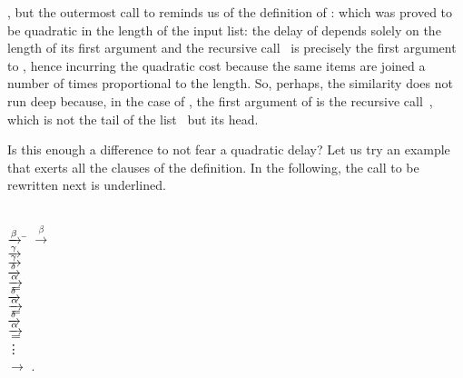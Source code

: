 \clause{\gamma}, but the outermost call to  reminds us
of the definition of :
 which was proved  to be
quadratic in the length of the input list: the delay
of  depends solely on the length of its first argument
and the recursive call~ is precisely the first
argument to , hence incurring the quadratic cost
because the same items are joined a number of times proportional to
the length. So, perhaps, the similarity does not run deep because, in
the case of , the first argument of 
is the recursive call~, which is not the tail of
the list~\erlcode{[[I|M]|L]} but its head.

Is this enough a difference to not fear a quadratic delay? Let us try
an example that exerts all the clauses of the definition. In the
following, the call to be rewritten next is
underlined.\label{trace:sflat_abc}
\begin{tabbing}
\underline{}\\
\erlcode{sflat([[]} \= \(\xrightarrow{\smash{\beta}}\) \=\kill
\> \(\xrightarrow{\beta}\) \> \underline{}\\
\> \(\xrightarrow{\smash{\gamma}}\) \> \\
\> \(\xrightarrow{\smash{\gamma}}\)
\> \\
\> \(\xrightarrow{\smash{\delta}}\)
\> \\
\> \(\xrightarrow{\smash{\alpha}}\)
\> \\
\> \(=\)
\> \\
\> \(\xrightarrow{\smash{\delta}}\)
\> \\
\> \(\xrightarrow{\smash{\alpha}}\)
\> \\
\> \(=\)
\> \\
\> \(\xrightarrow{\smash{\delta}}\)
\> \\
\> \(\xrightarrow{\smash{\alpha}}\)
\> \\
\> \(=\)
\> \\
\> \;\vdots\\
\> \(\rightarrow\) \> \erlcode{[a,b,c]}\textrm{.}
\end{tabbing}
